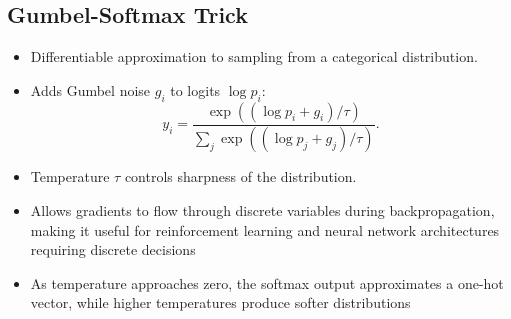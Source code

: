 \documentclass[12pt,a4paper]{article}
\begin{document}
\subsection{Gumbel-Softmax Trick}
\begin{itemize}
    \item Differentiable approximation to sampling from a categorical distribution.
    \item Adds Gumbel noise $g_i$ to logits $\log p_i$:
    \[ y_i = \frac{\exp((\log p_i + g_i)/\tau)}{\sum_j \exp((\log p_j + g_j)/\tau)}. \]
    \item Temperature $\tau$ controls sharpness of the distribution.
    \item Allows gradients to flow through discrete variables during backpropagation, making it useful for reinforcement learning and neural network architectures requiring discrete decisions
    \item As temperature approaches zero, the softmax output approximates a one-hot vector, while higher temperatures produce softer distributions
\end{itemize}
\end{document}
